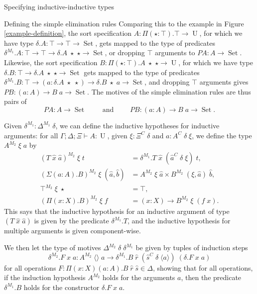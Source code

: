 \documentclass[acmsmall,review]{acmart}\settopmatter{printfolios=true,printccs=false,printacmref=false}
\DeclareMathOperator{\USet}{Set}
\DeclareMathOperator{\UU}{U}
\newcommand{\tac}{\vdash}
\def\emptytuple{\langle\rangle}
\begin{document}
\begin{section}{Specifying inductive-inductive types}
\begin{subsection}{\label{simple-elim-section}Defining the simple elimination rules}
Comparing this to the example in Figure \ref{example-definition}, the sort specification $A : \Pi(\star : \top).\top \to \UU$, for which we have type $\delta.A : \top \to \top \to \USet$, gets mapped to the type of predicates $\delta^{M_1}.A : \top \to \top \to \delta.A\;\star\;\star \to \USet$, or dropping $\top$ arguments to $PA : A \to \USet$. Likewise, the sort specification $B : \Pi(\star : \top).A\;\star\;\star \to \UU$, for which we have type $\delta.B : \top \to \delta.A\;\star\;\star \to \USet$ gets mapped to the type of predicates $\delta^{M_1}.B : \top \to (a : \delta.A\;\star\;\star) \to \delta.B\;\star\;a \to \USet$, and dropping $\top$ arguments gives $PB : (a : A) \to B\;a \to \USet$. The motives of the simple elimination rules are thus pairs of \[PA : A \to \USet\qquad\text{ and }\qquad PB : (a : A) \to B\;a \to \USet.\]

\begin{definition}
Given $\delta^{M_1} : \Delta^{M_1}\;\delta$, we can define the inductive hypotheses for inductive arguments: for all $\Gamma ; \Delta ; \Xi \tac A : \UU$, given $\xi : \Xi^C\;\delta$ and $a : A^C\;\delta\;\xi$, we define the type $A^{M_2}\;\xi\;a$ by
\begin{align*}
(T\;\hat{x}\;\hat{a})^{M_2}\;\xi\;t &= \delta^{M_1}.T\;\hat{x}\;(\hat{a}^{C}\;\delta\;\xi)\;t,\\
(\Sigma(a : A).B)^{M_2}\;\xi\;(\hat{a},\hat{b}) &= A^{M_2}\;\xi\;\hat{a} \times B^{M_2}\;(\xi,\hat{a})\;\hat{b},\\
\top^{M_2}\;\xi\;\star &= \top,\\
(\Pi(x : X).B)^{M_2}\;\xi\;f &= (x : X) \to B^{M_2}\;\xi\;(f\;x).
\end{align*}
This says that the inductive hypothesis for an inductive argument of type $(T\;\hat{x}\;\hat{a})$ is given by the predicate $\delta^{M_1}.T$, and the inductive hypothesis for multiple arguments is given component-wise.

We then let the type of motives $\Delta^{M_2}\;\delta\;\delta^{M_1}$ be given by tuples of induction steps \[\delta^{M_2}.F\;x\;a : A^{M_2}\;\emptytuple\;a\to \delta^{M_1}.B\; \hat{r}\;(\hat{s}^C\;\delta\;\langle a \rangle)\;(\delta.F\;x\;a)\] for all operations $F : \Pi(x : X)(a : A).B\;\hat{r}\;\hat{s} \in \Delta$, showing that for all operations, if the induction hypothesis $A^{M_2}$ holds for the arguments $a$, then the predicate $\delta^{M_1}.B$ holds for the constructor $\delta.F\;x\;a$.
\end{definition}


\end{subsection}
\end{section}
\end{document}
